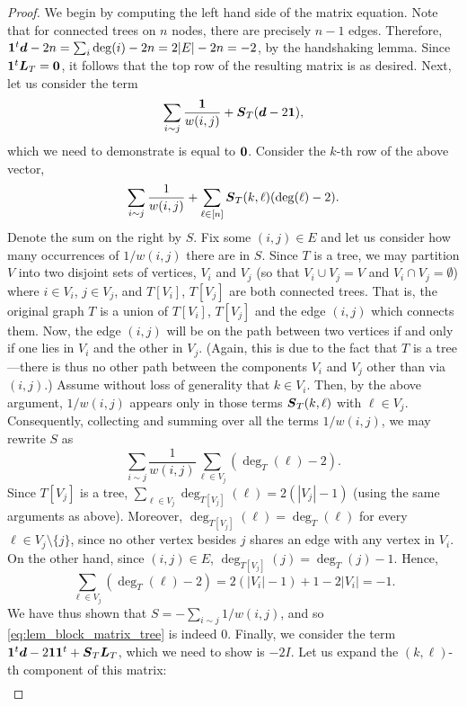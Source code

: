 \begin{proof}
We begin by computing the left hand side of the matrix equation. Note that for connected trees on $n$ nodes, there are  precisely $n-1$ edges. Therefore, $\vb{1}^t \vb*{d}-2n = \sum_i \deg(i) - 2n = 2|E| -2n = -2$, by the handshaking lemma. Since $\vb{1}^t\vb*{L}_T=\vb{0}$, it follows that the top row of the resulting matrix is as desired. Next, let us consider the term 
\[\sum_{i\sim j}\frac{\vb{1}}{w(i,j)} + \vb*{S}_T(\vb*{d}-2\vb{1}),\]
which we need to demonstrate is equal to $\vb{0}$. Consider the $k$-th row of the above vector, 
\begin{equation}
\label{eq:lem_block_matrix_tree}
\sum_{i\sim j}\frac{1}{w(i,j)} + \sum_{\ell\in[n]}\vb*{S}_T(k,\ell)(\deg(\ell)-2).
\end{equation}
Denote the sum on the right by $S$. Fix some $(i,j)\in E$ and let us consider how many occurrences of $1/w(i,j)$ there are in $S$. Since $T$ is a tree, we may partition $V$ into two disjoint sets of vertices, $V_i$ and $V_j$ (so that $V_i\cup V_j=V$ and $V_i\cap V_j=\emptyset$) where $i\in V_i$,  $j\in V_j$, and $T[V_i]$, $T[V_j]$ are both connected trees. That is, the original graph $T$ is a union of $T[V_i]$, $T[V_j]$ and the edge $(i,j)$ which connects them. Now, the edge $(i,j)$ will be on the path between two vertices if and only if one lies in $V_i$ and the other in $V_j$. (Again, this is due to the fact that $T$ is a tree---there is thus no other path between the components  $V_i$ and $V_j$ other than via $(i,j)$.)   
Assume without loss of generality that $k\in V_i$. Then,  by the above argument, $1/w(i,j)$ appears only in those terms $\vb*{S}_T(k,\ell)$ with $\ell\in V_j$. 
Consequently, collecting and summing over all the terms $1/w(i,j)$, we may rewrite $S$ as 
\[\sum_{i\sim j} \frac{1}{w(i,j)}\sum_{\ell \in V_j} (\deg_T(\ell)-2).\]
Since $T[V_j]$ is a tree, $\sum_{\ell\in V_j}\deg_{T[V_j]}(\ell)=2(|V_j|-1)$ (using the same arguments as above). Moreover, $\deg_{T[V_j]}(\ell)=\deg_T(\ell)$ for every $\ell\in V_j\setminus \{j\}$, since no other vertex besides $j$ shares an edge with any vertex in $V_i$. On the other hand, since $(i,j)\in E$,  $\deg_{T[V_j]}(j) = \deg_T(j)-1$. Hence, 
\[\sum_{\ell\in V_j}(\deg_T(\ell)-2) = 2(|V_i|-1) + 1 - 2|V_i| = -1.\]
We have thus shown that $S=-\sum_{i\sim j}1/w(i,j)$, and so \eqref{eq:lem_block_matrix_tree} is indeed 0. Finally, we consider the term $\vb{1}^t \vb*{d} - 2\vb{1}\vb{1}^t + \vb*{S}_T\vb*{L}_T$, which we need to show is $-2I$. Let us expand  the $(k,\ell)$-th component of this matrix: 
\begin{align*}

\end{align*}
\end{proof}
